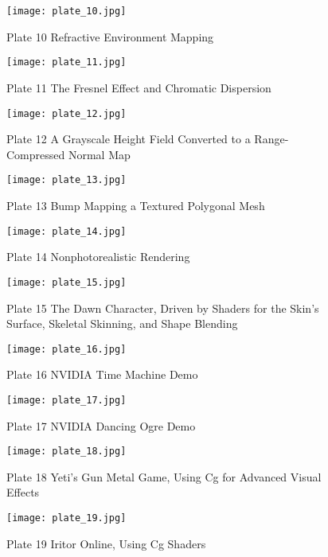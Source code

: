 \documentclass[../main.tex]{subfiles}
\begin{document}
\FloatBarrier
\begin{figure}
    \centering
    \texttt{[image: plate\_10.jpg]}
    \caption{Plate 10 Refractive Environment Mapping}
    \label{fig:plate-10}
\end{figure}
\FloatBarrier
\begin{figure}
    \centering
    \texttt{[image: plate\_11.jpg]}
    \caption{Plate 11 The Fresnel Effect and Chromatic Dispersion}
    \label{fig:plate-11}
\end{figure}
\FloatBarrier
\begin{figure}
    \centering
    \texttt{[image: plate\_12.jpg]}
    \caption{Plate 12 A Grayscale Height Field Converted to a Range-Compressed Normal Map}
    \label{fig:plate-12}
\end{figure}
\FloatBarrier
\begin{figure}
    \centering
    \texttt{[image: plate\_13.jpg]}
    \caption{Plate 13 Bump Mapping a Textured Polygonal Mesh}
    \label{fig:plate-13}
\end{figure}
\FloatBarrier
\begin{figure}
    \centering
    \texttt{[image: plate\_14.jpg]}
    \caption{Plate 14 Nonphotorealistic Rendering}
    \label{fig:plate-14}
\end{figure}
\FloatBarrier
\begin{figure}
    \centering
    \texttt{[image: plate\_15.jpg]}
    \caption{Plate 15 The Dawn Character, Driven by Shaders for the Skin's Surface, Skeletal Skinning, and Shape Blending}
    \label{fig:plate-15}
\end{figure}
\FloatBarrier
\begin{figure}
    \centering
    \texttt{[image: plate\_16.jpg]}
    \caption{Plate 16 NVIDIA Time Machine Demo}
    \label{fig:plate-16}
\end{figure}
\FloatBarrier
\begin{figure}
    \centering
    \texttt{[image: plate\_17.jpg]}
    \caption{Plate 17 NVIDIA Dancing Ogre Demo}
    \label{fig:plate-17}
\end{figure}
\FloatBarrier
\begin{figure}
    \centering
    \texttt{[image: plate\_18.jpg]}
    \caption{Plate 18 Yeti's Gun Metal Game, Using Cg for Advanced Visual Effects}
    \label{fig:plate-18}
\end{figure}
\FloatBarrier
\begin{figure}
    \centering
    \texttt{[image: plate\_19.jpg]}
    \caption{Plate 19 Iritor Online, Using Cg Shaders}
    \label{fig:plate-19}
\end{figure}
\end{document}
